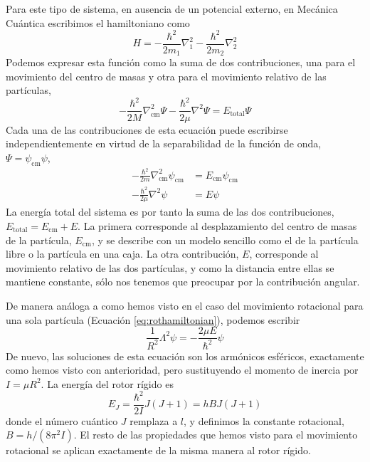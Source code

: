 Para este tipo de sistema, en ausencia de un potencial 
externo, en Mecánica Cuántica escribimos el hamiltoniano
como 
\begin{equation}
    H=-\frac{\hbar^2}{2m_1}\nabla_1^2-\frac{\hbar^2}{2m_2}\nabla_2^2
\end{equation}
Podemos expresar esta función como la suma de dos 
contribuciones, una para el movimiento del centro de 
masas y otra para el movimiento relativo de las partículas,
\begin{equation}
    -\frac{\hbar^2}{2M}\nabla_\mathrm{cm}^2\Psi 
    -\frac{\hbar^2}{2\mu}\nabla^2\Psi=E_\mathrm{total}\Psi
\end{equation}
Cada una de las contribuciones de esta ecuación puede 
escribirse independientemente en virtud de la separabilidad 
de la función de onda, $\Psi=\psi_\mathrm{cm}\psi$,
\begin{subequations}
    \begin{align}
        -\frac{\hbar^2}{2m}\nabla^2_\mathrm{cm}\psi_\mathrm{cm}&=
        E_\mathrm{cm}\psi_\mathrm{cm} \\
        -\frac{\hbar^2}{2\mu}\nabla^2\psi&=
        E\psi
    \end{align}
\end{subequations}
La energía total del sistema es por tanto la suma de 
las dos contribuciones, $E_\mathrm{total}=E_\mathrm{cm}+E$.
La primera corresponde al desplazamiento del centro de 
masas de la partícula, $E_\mathrm{cm}$, y se describe 
con un modelo sencillo como el de la partícula 
libre o la partícula en una caja. La otra contribución,
$E$, corresponde
al movimiento relativo de las dos 
partículas, y como la distancia entre
ellas se mantiene constante, sólo nos 
tenemos que preocupar por la 
contribución angular. 

De manera análoga a como hemos visto en el caso 
del movimiento rotacional para una sola partícula 
(Ecuación \ref{eq:rothamiltonian}), podemos
escribir
\begin{equation}
\frac{1}{R^2}\Lambda^2\psi=-\frac{2\mu E}{\hbar^2}\psi
\label{eq:rotor}
\end{equation}
De nuevo, las soluciones de esta ecuación son los 
armónicos esféricos, exactamente como hemos visto con
anterioridad, pero sustituyendo el momento de
inercia por $I=\mu R^2$. La energía del rotor rígido es 
\begin{equation}
    E_J=\frac{\hbar^2}{2I}J(J+1)=hBJ(J+1)
\end{equation}
donde el número cuántico $J$ remplaza a $l$, y 
definimos la constante rotacional, $B=h/(8\pi^2I)$. 
El resto de las propiedades que hemos visto para el
movimiento rotacional se aplican exactamente de la 
misma manera al rotor rígido.

